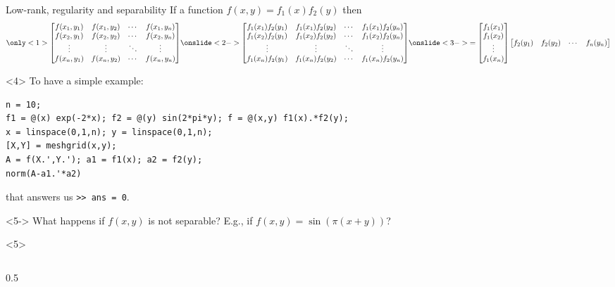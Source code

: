 \documentclass[aspectratio=169,xcolor=dvipsnames]{beamer}
\begin{document}
	\begin{frame}[fragile]{Low-rank, regularity and separability}
	\faLightbulb\; If a function $f(x,y) = f_1(x)f_2(y)$ then
	\[
	\only<1>{\begin{bmatrix}
	f(x_1,y_1) & f(x_1,y_2) & \cdots & f(x_1,y_n) \\
	f(x_2,y_1) & f(x_2,y_2) & \cdots & f(x_2,y_n) \\
	\vdots & \vdots & \ddots & \vdots \\
	f(x_n,y_1) & f(x_n,y_2) & \cdots & f(x_n,y_n) \\
	\end{bmatrix}}\onslide<2->{	\begin{bmatrix}
	f_1(x_1)f_2(y_1) & f_1(x_1)f_2(y_2) & \cdots & f_1(x_1)f_2(y_n) \\
	f_1(x_2)f_2(y_1) & f_1(x_2)f_2(y_2) & \cdots & f_1(x_2)f_2(y_n) \\
	\vdots & \vdots & \ddots & \vdots \\
	f_1(x_n)f_2(y_1) & f_1(x_n)f_2(y_2) & \cdots & f_1(x_n)f_2(y_n) \\
\end{bmatrix}} \onslide<3->{= \begin{bmatrix}
	f_1(x_1) \\
	f_1(x_2) \\
	\vdots \\
	f_1(x_n) 
	\end{bmatrix} \begin{bmatrix}
	f_2(y_1) & f_2(y_2) & \cdots & f_n(y_n)
\end{bmatrix}}
	\] 
	\begin{onlyenv}
\faEye\; To have a simple example:\vspace{-0.5em}
\begin{verbatim}
n = 10;
f1 = @(x) exp(-2*x); f2 = @(y) sin(2*pi*y); f = @(x,y) f1(x).*f2(y);
x = linspace(0,1,n); y = linspace(0,1,n);
[X,Y] = meshgrid(x,y);
A = f(X.',Y.'); a1 = f1(x); a2 = f2(y);
norm(A-a1.'*a2)
\end{verbatim}
that answers us \texttt{>> ans = 0}.
	\end{onlyenv}
	\begin{onlyenv}<5->
	What happens if $f(x,y)$ is not separable? E.g., if $f(x,y) = \sin(\pi(x+y))$?
	\begin{onlyenv}
	\begin{columns}
	\begin{column}{0.5\columnwidth}

\end{column}
\end{columns}
\end{onlyenv}
\end{onlyenv}
\end{frame}
\end{document}
